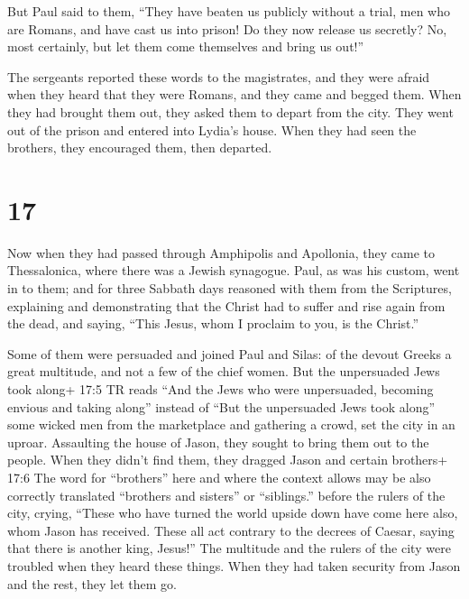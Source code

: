  But Paul said to them, ``They have beaten us publicly
without a trial, men who are Romans, and have cast us into prison! Do
they now release us secretly? No, most certainly, but let them come
themselves and bring us out!''

 The sergeants reported these words to the magistrates, and
they were afraid when they heard that they were Romans, 
and they came and begged them. When they had brought them out, they
asked them to depart from the city.  They went out of the
prison and entered into Lydia's house. When they had seen the brothers,
they encouraged them, then departed.

\hypertarget{section-16}{%
\section{17}\label{section-16}}

 Now when they had passed through Amphipolis and Apollonia,
they came to Thessalonica, where there was a Jewish synagogue.
 Paul, as was his custom, went in to them; and for three
Sabbath days reasoned with them from the Scriptures, 
explaining and demonstrating that the Christ had to suffer and rise
again from the dead, and saying, ``This Jesus, whom I proclaim to you,
is the Christ.''

 Some of them were persuaded and joined Paul and Silas: of
the devout Greeks a great multitude, and not a few of the chief women.
 But the unpersuaded Jews took along+ 17:5 TR reads ``And
the Jews who were unpersuaded, becoming envious and taking along''
instead of ``But the unpersuaded Jews took along'' some wicked men from
the marketplace and gathering a crowd, set the city in an uproar.
Assaulting the house of Jason, they sought to bring them out to the
people.  When they didn't find them, they dragged Jason and
certain brothers+ 17:6 The word for ``brothers'' here and where the
context allows may be also correctly translated ``brothers and sisters''
or ``siblings.'' before the rulers of the city, crying, ``These who have
turned the world upside down have come here also,  whom
Jason has received. These all act contrary to the decrees of Caesar,
saying that there is another king, Jesus!''  The multitude
and the rulers of the city were troubled when they heard these things.
 When they had taken security from Jason and the rest, they
let them go.

